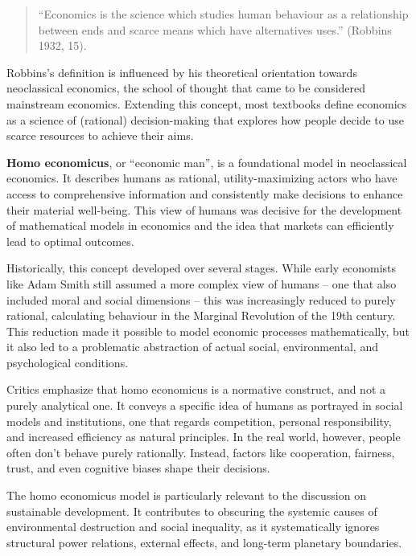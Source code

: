 \documentclass[
  a4paper,
  DIV=11,
  numbers=noendperiod,
  oneside,
  openany]{scrreprt}
\begin{document}
\begin{quote}
``Economics is the science which studies human behaviour as a
relationship between ends and scarce means which have alternatives
uses.'' (Robbins 1932, 15).
\end{quote}

Robbins's definition is influenced by his theoretical orientation
towards neoclassical economics, the school of thought that came to be
considered mainstream economics. Extending this concept, most textbooks
define economics as a science of (rational) decision-making that
explores how people decide to use scarce resources to achieve their
aims.

\begin{tcolorbox}[enhanced jigsaw, arc=.35mm, bottomrule=.15mm, bottomtitle=1mm, breakable, colback=white, colbacktitle=quarto-callout-note-color!10!white, colframe=quarto-callout-note-color-frame, coltitle=black, left=2mm, leftrule=.75mm, opacityback=0, opacitybacktitle=0.6, rightrule=.15mm, title={Homo economicus as the foundational model of human behaviour}, titlerule=0mm, toprule=.15mm, toptitle=1mm]

\textbf{Homo economicus}, or ``economic man'', is a foundational model
in neoclassical economics. It describes humans as rational,
utility-maximizing actors who have access to comprehensive information
and consistently make decisions to enhance their material well-being.
This view of humans was decisive for the development of mathematical
models in economics and the idea that markets can efficiently lead to
optimal outcomes.

Historically, this concept developed over several stages. While early
economists like Adam Smith still assumed a more complex view of humans
-- one that also included moral and social dimensions -- this was
increasingly reduced to purely rational, calculating behaviour in the
Marginal Revolution of the 19th century. This reduction made it possible
to model economic processes mathematically, but it also led to a
problematic abstraction of actual social, environmental, and
psychological conditions.

Critics emphasize that homo economicus is a normative construct, and not
a purely analytical one. It conveys a specific idea of humans as
portrayed in social models and institutions, one that regards
competition, personal responsibility, and increased efficiency as
natural principles. In the real world, however, people often don't
behave purely rationally. Instead, factors like cooperation, fairness,
trust, and even cognitive biases shape their decisions.

The homo economicus model is particularly relevant to the discussion on
sustainable development. It contributes to obscuring the systemic causes
of environmental destruction and social inequality, as it systematically
ignores structural power relations, external effects, and long-term
planetary boundaries.

\end{tcolorbox}
\end{document}
